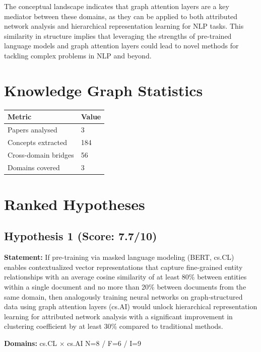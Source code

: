 \documentclass[12pt,a4paper]{article}
\begin{document}
The conceptual landscape indicates that graph attention layers are a key mediator between these domains, as they can be applied to both attributed network analysis and hierarchical representation learning for NLP tasks. This similarity in structure implies that leveraging the strengths of pre-trained language models and graph attention layers could lead to novel methods for tackling complex problems in NLP and beyond.

\section{Knowledge Graph Statistics}

\begin{tabular}{ll}
\toprule
Metric & Value \\
\midrule
Papers analysed   & 3 \\
Concepts extracted & 184 \\
Cross-domain bridges & 56 \\
Domains covered   & 3 \\
\bottomrule
\end{tabular}

\section{Ranked Hypotheses}

\subsection*{Hypothesis 1 (Score: 7.7/10)}

\textbf{Statement:} If pre-training via masked language modeling (BERT, cs.CL) enables contextualized vector representations that capture fine-grained entity relationships with an average cosine similarity of at least 80\% between entities within a single document and no more than 20\% between documents from the same domain, then analogously training neural networks on graph-structured data using graph attention layers (cs.AI) would unlock hierarchical representation learning for attributed network analysis with a significant improvement in clustering coefficient by at least 30\% compared to traditional methods.

\noindent\textbf{Domains:} cs.CL $\times$ cs.AI
\hspace{1em} N=8 / F=6 / I=9
\end{document}
